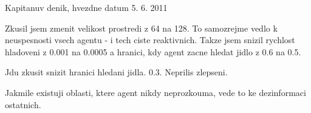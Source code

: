 Kapitanuv denik, hvezdne datum 5. 6. 2011

Zkusil jsem zmenit velikost prostredi z 64 na 128. To samozrejme vedlo k neuspesnosti
vsech agentu - i tech ciste reaktivnich. Takze jsem snizil rychlost hladoveni z 0.001 na 0.0005 a hranici,
kdy agent zacne hledat jidlo z 0.6 na 0.5.

Jdu zkusit snizit hranici hledani jidla. 0.3. Neprilis zlepseni.

Jakmile existuji oblasti, ktere agent nikdy neprozkouma, vede to ke dezinformaci
ostatnich.